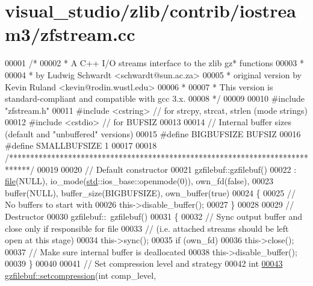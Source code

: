 \hypertarget{visual__studio_2zlib_2contrib_2iostream3_2zfstream_8cc_source}{}\section{visual\+\_\+studio/zlib/contrib/iostream3/zfstream.cc}
\label{visual__studio_2zlib_2contrib_2iostream3_2zfstream_8cc_source}

\begin{DoxyCode}
00001 \textcolor{comment}{/*}
00002 \textcolor{comment}{ * A C++ I/O streams interface to the zlib gz* functions}
00003 \textcolor{comment}{ *}
00004 \textcolor{comment}{ * by Ludwig Schwardt <schwardt@sun.ac.za>}
00005 \textcolor{comment}{ * original version by Kevin Ruland <kevin@rodin.wustl.edu>}
00006 \textcolor{comment}{ *}
00007 \textcolor{comment}{ * This version is standard-compliant and compatible with gcc 3.x.}
00008 \textcolor{comment}{ */}
00009 
00010 \textcolor{preprocessor}{#include "zfstream.h"}
00011 \textcolor{preprocessor}{#include <cstring>}          \textcolor{comment}{// for strcpy, strcat, strlen (mode strings)}
00012 \textcolor{preprocessor}{#include <cstdio>}           \textcolor{comment}{// for BUFSIZ}
00013 
00014 \textcolor{comment}{// Internal buffer sizes (default and "unbuffered" versions)}
00015 \textcolor{preprocessor}{#define BIGBUFSIZE BUFSIZ}
00016 \textcolor{preprocessor}{#define SMALLBUFSIZE 1}
00017 
00018 \textcolor{comment}{/*****************************************************************************/}
00019 
00020 \textcolor{comment}{// Default constructor}
00021 gzfilebuf::gzfilebuf()
00022 : \hyperlink{structfile}{file}(NULL), io\_mode(\hyperlink{namespacestd}{std}::ios\_base::openmode(0)), own\_fd(false),
00023   buffer(NULL), buffer\_size(BIGBUFSIZE), own\_buffer(true)
00024 \{
00025   \textcolor{comment}{// No buffers to start with}
00026   this->disable\_buffer();
00027 \}
00028 
00029 \textcolor{comment}{// Destructor}
00030 gzfilebuf::~gzfilebuf()
00031 \{
00032   \textcolor{comment}{// Sync output buffer and close only if responsible for file}
00033   \textcolor{comment}{// (i.e. attached streams should be left open at this stage)}
00034   this->sync();
00035   \textcolor{keywordflow}{if} (own\_fd)
00036     this->close();
00037   \textcolor{comment}{// Make sure internal buffer is deallocated}
00038   this->disable\_buffer();
00039 \}
00040 
00041 \textcolor{comment}{// Set compression level and strategy}
00042 \textcolor{keywordtype}{int}
\hyperlink{classgzfilebuf_ad109ea4fc4ca7cc19d8014b53375255d}{00043} \hyperlink{classgzfilebuf_ad109ea4fc4ca7cc19d8014b53375255d}{gzfilebuf::setcompression}(\textcolor{keywordtype}{int} comp\_level,

\end{DoxyCode}

